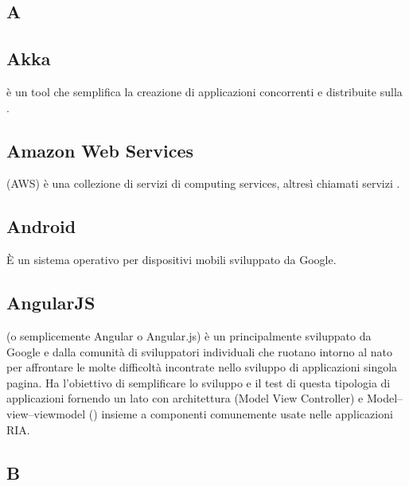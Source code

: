\newpage

\begin{center}
\Huge\section{\uppercase{A}}
\end{center}

\subsection{Akka}
 è un tool  che semplifica la creazione di applicazioni concorrenti e distribuite sulla .

\subsection{Amazon Web Services}
 (AWS) è una collezione di servizi di  computing services, altresì chiamati servizi .

\subsection{Android}
È un sistema operativo  per dispositivi mobili sviluppato da Google.

\subsection{AngularJS}
 (o semplicemente Angular o Angular.js) è un    principalmente sviluppato da Google e dalla comunità di sviluppatori individuali che ruotano intorno al  nato per affrontare le molte difficoltà incontrate nello sviluppo di applicazioni singola pagina. Ha l'obiettivo di semplificare lo sviluppo e il test di questa tipologia di applicazioni fornendo un  lato  con architettura  (Model View Controller) e Model–view–viewmodel () insieme a componenti comunemente usate nelle applicazioni RIA.

\newpage

\begin{center}
\Huge\section{\uppercase{B}}
\end{center}

